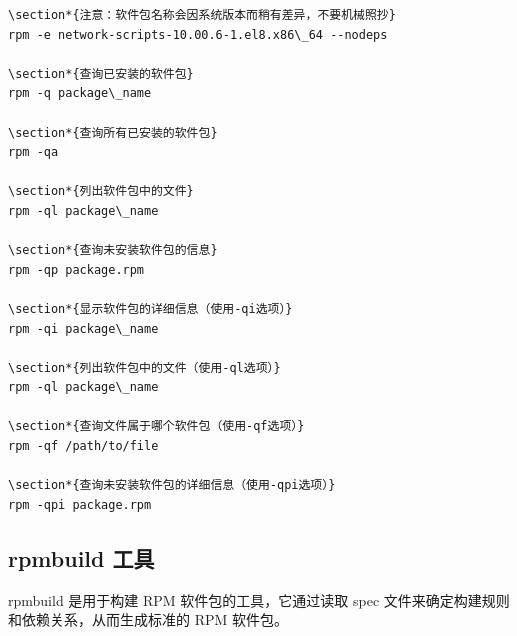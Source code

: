 \documentclass[12pt,UTF8]{ctexbook}
\begin{document}
\begin{verbatim}
\section*{注意：软件包名称会因系统版本而稍有差异，不要机械照抄}
rpm -e network-scripts-10.00.6-1.el8.x86\_64 --nodeps

\section*{查询已安装的软件包}
rpm -q package\_name

\section*{查询所有已安装的软件包}
rpm -qa

\section*{列出软件包中的文件}
rpm -ql package\_name

\section*{查询未安装软件包的信息}
rpm -qp package.rpm

\section*{显示软件包的详细信息（使用-qi选项）}
rpm -qi package\_name

\section*{列出软件包中的文件（使用-ql选项）}
rpm -ql package\_name

\section*{查询文件属于哪个软件包（使用-qf选项）}
rpm -qf /path/to/file

\section*{查询未安装软件包的详细信息（使用-qpi选项）}
rpm -qpi package.rpm
\end{verbatim}

\subsection{rpmbuild 工具}
rpmbuild 是用于构建 RPM 软件包的工具，它通过读取 spec 文件来确定构建规则和依赖关系，从而生成标准的 RPM 软件包。
\end{document}
